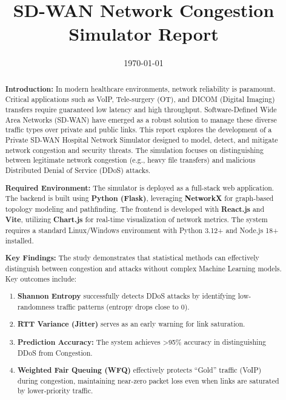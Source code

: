 \documentclass[12pt]{report}
\title{SD-WAN Network Congestion Simulator Report}
\author{}
\date{\today}
\begin{document}
\maketitle

\begin{abstract}
\textbf{Introduction:} In modern healthcare environments, network reliability is paramount. Critical applications such as VoIP, Tele-surgery (OT), and DICOM (Digital Imaging) transfers require guaranteed low latency and high throughput. Software-Defined Wide Area Networks (SD-WAN) have emerged as a robust solution to manage these diverse traffic types over private and public links. This report explores the development of a Private SD-WAN Hospital Network Simulator designed to model, detect, and mitigate network congestion and security threats. The simulation focuses on distinguishing between legitimate network congestion (e.g., heavy file transfers) and malicious Distributed Denial of Service (DDoS) attacks.

\textbf{Required Environment:} The simulator is deployed as a full-stack web application. The backend is built using \textbf{Python (Flask)}, leveraging \textbf{NetworkX} for graph-based topology modeling and pathfinding. The frontend is developed with \textbf{React.js} and \textbf{Vite}, utilizing \textbf{Chart.js} for real-time visualization of network metrics. The system requires a standard Linux/Windows environment with Python 3.12+ and Node.js 18+ installed.

\textbf{Key Findings:} The study demonstrates that statistical methods can effectively distinguish between congestion and attacks without complex Machine Learning models. Key outcomes include:
\begin{enumerate}
    \item \textbf{Shannon Entropy} successfully detects DDoS attacks by identifying low-randomness traffic patterns (entropy drops close to 0).
    \item \textbf{RTT Variance (Jitter)} serves as an early warning for link saturation.
    \item \textbf{Prediction Accuracy:} The system achieves >95\% accuracy in distinguishing DDoS from Congestion.
    \item \textbf{Weighted Fair Queuing (WFQ)} effectively protects ``Gold'' traffic (VoIP) during congestion, maintaining near-zero packet loss even when links are saturated by lower-priority traffic.
\end{enumerate}
\end{abstract}
\end{document}

